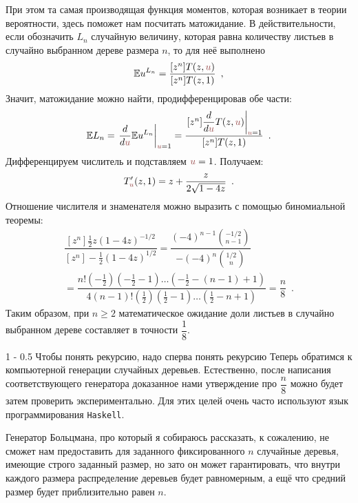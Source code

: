 \documentclass[a5paper]{article}
\makeatletter
\theoremstyle{definition}
\renewcommand{\section}{\@startsection
{section}%
{1}%
{\z@}%
{-\baselineskip}%
{0.5\baselineskip}%
{\centering\large\scshape}} %
\makeatother
\begin{document}
При этом та самая производящая функция моментов, которая возникает в теории
вероятности, здесь поможет нам посчитать матожидание. В действительности, 
если обозначить \( L_n \) случайную величину, которая равна количеству листьев в
случайно выбранном дереве размера \( n \), то для неё выполнено
\begin{equation}
    \mathbb E u^{L_n} = \dfrac{[z^n] T(z, \uu)}{[z^n]T(z,1)} 
    \enspace ,
\end{equation}
Значит, матожидание можно найти, продифференцировав обе части:
\begin{equation}
    \mathbb E L_n = \left. \dfrac{d}{d \uu} \mathbb E u^{L_n} \right|_{\uu = 1}
    = \dfrac
        {\left. [z^n] \dfrac{d}{d \uu} T(z, \uu)\right|_{\uu = 1}}
        {[z^n] T(z, 1)}
    \enspace .
\end{equation}
Дифференцируем числитель и подставляем \( \uu = 1 \). Получаем:
\begin{equation}
    T'_{\uu}(z, 1) = z + \dfrac{z}{2 \sqrt{1 - 4z}} \enspace .
\end{equation}
Отношение числителя и знаменателя можно выразить с помощью биномиальной теоремы:
\begin{multline*}
    \dfrac
        { [z^n] \tfrac12 z(1-4z)^{-1/2} }
        { [z^n] -\tfrac12 (1-4z)^{1/2} }
    = 
    \dfrac
        { (-4)^{n-1} {-1/2 \choose n-1} }
        { -(-4)^n {1/2 \choose n} }
    \\=
    \dfrac{n! (-\tfrac12)(-\tfrac12-1) \ldots (-\tfrac12 - (n-1) + 1)}
    {4(n-1)! (\tfrac12)(\tfrac12 - 1) \ldots (\tfrac12 - n + 1)}
    = \dfrac{n}{8}
    \enspace .
\end{multline*}
Таким образом, при \( n \geq 2 \) математическое ожидание доли листьев в случайно
выбранном дереве составляет в точности \( \dfrac18 \).

\section{Чтобы понять рекурсию, надо сперва понять рекурсию}
Теперь обратимся к компьютерной генерации случайных деревьев.
Естественно, после написания соответствующего генератора доказанное нами
утверждение про \( \dfrac n8 \) можно будет затем проверить экспериментально.
Для этих целей очень часто используют язык
программирования \texttt{Haskell}.

Генератор Больцмана, про который я собираюсь рассказать, к сожалению, не сможет нам предоставить
для заданного фиксированного \( n \) случайные деревья, имеющие строго заданный
размер, но зато он может гарантировать, что внутри каждого размера распределение
деревьев будет равномерным, а ещё что средний размер будет приблизительно равен
\( n \).
\end{document}
